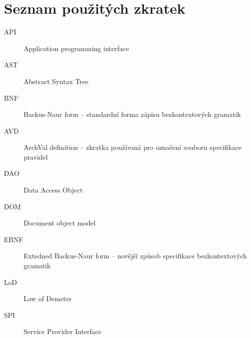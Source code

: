 \chapter{Seznam použitých zkratek}

\begin{description}
\item[API] Application programming interface
\item[AST] Abstract Syntax Tree
\item[BNF] Backus-Naur form -- standardní forma zápisu bezkontextových gramatik
\item[AVD] ArchVal definition -- zkratka používaná pro označení souboru specifikace pravidel
\item[DAO] Data Access Object
\item[DOM] Document object model
\item[EBNF] Extedned Backus-Naur form -- novější způsob specifikace bezkontextových gramatik
\item[LoD] Law of Demeter
\item[SPI] Service Provider Interface
\end{description}
